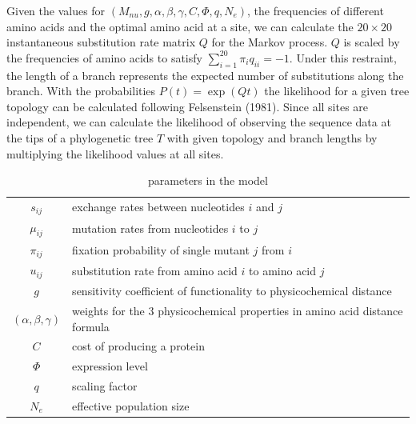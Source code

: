 \documentclass[13pt]{article}
\begin{document}
Given the values for $(M_{nu},g, \alpha, \beta, \gamma, C, \Phi, q, N_e)$, the frequencies of different amino acids and the optimal amino acid at a site, we can calculate the $20 \times 20$ instantaneous substitution rate matrix $Q$ for the Markov process. $Q$ is scaled by the frequencies of amino acids to satisfy $\sum_{i=1}^{20} \pi_i q_{ii}= -1$.
Under this restraint, the length of a branch represents the expected number of substitutions along the branch.
With the probabilities $P(t)  = \exp(Qt)$ the likelihood for a given tree topology can be calculated following Felsenstein (1981).
Since all sites are independent, we can calculate the likelihood of observing the sequence data at the tips of a phylogenetic tree $T$ with given topology and branch lengths by multiplying the likelihood values at all sites.\\

\begin{table}[h]
\centering
\caption{parameters in the model}
\begin{tabular}{ c p{10cm} }
\hline
$s_{ij}$ & exchange rates between nucleotides $i$ and $j$ \\
$\mu_{ij}$ & mutation rates from nucleotides $i$ to $j$\\
$\pi_{ij}$ & fixation probability of single mutant $j$ from $i$\\
$u_{ij}$ & substitution rate from amino acid $i$ to amino acid $j$\\
$g$       & sensitivity coefficient of functionality to physicochemical distance \\
$(\alpha,\beta,\gamma)$ & weights for the 3 physicochemical properties in amino acid distance formula \\
$C$ & cost of producing a protein\\
$\Phi$ & expression level \\
$q$ & scaling factor \\
$N_e$ & effective population size \\
\hline
\end{tabular}

\label{tb: para}
\end{table}
\end{document}
